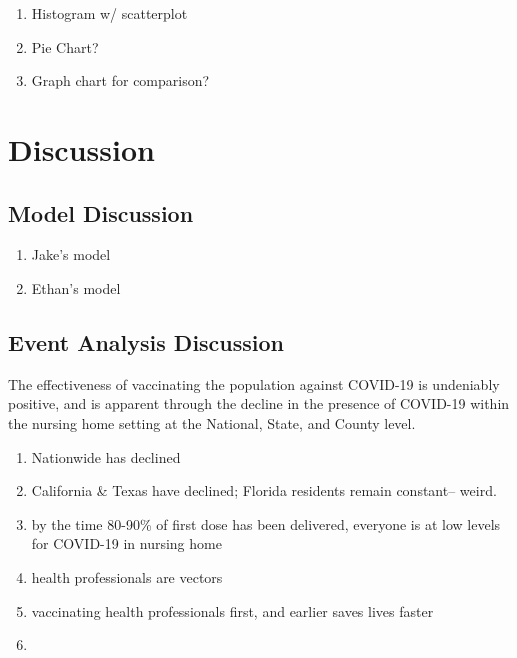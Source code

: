 \documentclass[twoside]{article}
\begin{document}
\begin{multicols}{2}
\begin{enumerate}
	\item Histogram w/ scatterplot 
	\item Pie Chart?
	\item Graph chart for comparison?
\end{enumerate}


\section{Discussion}

\subsection{Model Discussion}

\begin{enumerate}
	\item Jake's model
	\item Ethan's model
\end{enumerate}


\subsection{Event Analysis Discussion}

The effectiveness of vaccinating the population against COVID-19 is undeniably positive, and is apparent through the decline in the presence of COVID-19 within the nursing home setting at the National, State, and County level. 

\vspace{5mm}

\begin{enumerate}
	\item Nationwide has declined
	\item California \& Texas have declined; Florida residents remain constant-- weird.
	\item by the time 80-90\% of first dose has been delivered, everyone is at low levels for COVID-19 in nursing home
	\item health professionals are vectors
	\item vaccinating health professionals first, and earlier saves lives faster
	\item 
	
\end{enumerate} 



\end{multicols}
\end{document}

